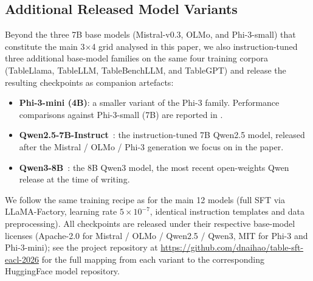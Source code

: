 \documentclass[11pt]{article}
\begin{document}


\subsection{Additional Released Model Variants}
\label{app-subsec: additional-released-variants}

Beyond the three 7B base models (Mistral-v0.3, OLMo, and Phi-3-small) that constitute the main 3$\times$4 grid analysed in this paper, we also instruction-tuned three additional base-model families on the same four training corpora (TableLlama, TableLLM, TableBenchLLM, and TableGPT) and release the resulting checkpoints as companion artefacts:

\begin{itemize}[leftmargin=1.5em, itemsep=0.2em, topsep=0.4em]
    \item \textbf{Phi-3-mini (4B)}: a smaller variant of the Phi-3 family. Performance comparisons against Phi-3-small (7B) are reported in .
    \item \textbf{Qwen2.5-7B-Instruct}~\citep{yang2024qwen2}: the instruction-tuned 7B Qwen2.5 model, released after the Mistral / OLMo / Phi-3 generation we focus on in the paper.
    \item \textbf{Qwen3-8B}~\citep{yang2024qwen2}: the 8B Qwen3 model, the most recent open-weights Qwen release at the time of writing.
\end{itemize}

We follow the same training recipe as for the main 12 models (full SFT via LLaMA-Factory, learning rate $5\times 10^{-7}$, identical instruction templates and data preprocessing). All checkpoints are released under their respective base-model licenses (Apache-2.0 for Mistral / OLMo / Qwen2.5 / Qwen3, MIT for Phi-3 and Phi-3-mini); see the project repository at \url{https://github.com/dnaihao/table-sft-eacl-2026} for the full mapping from each variant to the corresponding HuggingFace model repository.
\end{document}
